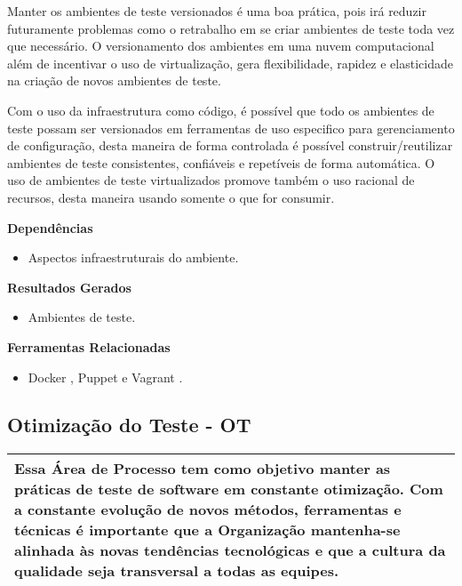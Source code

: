 Manter os ambientes de teste versionados é uma boa prática, pois irá reduzir futuramente problemas como o retrabalho em se criar ambientes de teste toda vez que necessário. O versionamento dos ambientes em uma nuvem computacional além de incentivar o uso de virtualização, gera flexibilidade, rapidez e elasticidade na criação de novos ambientes de teste.

Com o uso da infraestrutura como código, é possível que todo os ambientes de teste possam ser versionados em ferramentas de uso especifico para gerenciamento de configuração, desta maneira de forma controlada é possível construir/reutilizar ambientes de teste consistentes, confiáveis e repetíveis de forma automática. O uso de ambientes de teste virtualizados promove também o uso racional de recursos, desta maneira usando somente o que for consumir.

\textbf{Dependências}
\begin{itemize}
    \item Aspectos infraestruturais do ambiente.
\end{itemize}

\textbf{Resultados Gerados}
\begin{itemize}
    \item Ambientes de teste.

\end{itemize}

\textbf{Ferramentas Relacionadas}
\begin{itemize}
    \item Docker \cite{Docker}, Puppet \cite{Puppet} e Vagrant \cite{Vagrant}.
\end{itemize}

\subsection{Otimização do  Teste - OT}
\label{sec:ot}

\begin{table}[H]
\centering
\begin{tabular}{|p{130mm}|}
\hline
Essa Área de Processo tem como objetivo manter as práticas de teste de software em constante otimização. Com a constante evolução de novos métodos, ferramentas e técnicas é importante que a Organização mantenha-se alinhada às novas tendências tecnológicas e que a cultura da qualidade seja transversal a todas as equipes. \\
\hline
\end{tabular}
\end{table}

